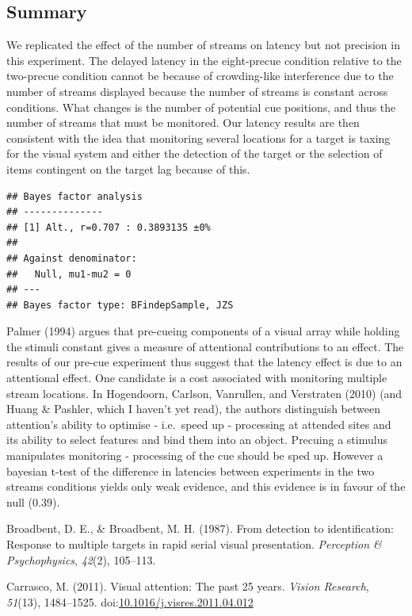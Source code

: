 \documentclass[,man]{apa6}
\theoremstyle{definition}
\theoremstyle{definition}
\theoremstyle{definition}
\theoremstyle{remark}
\begin{document}
\subsection{Summary}\label{summary}

We replicated the effect of the number of streams on latency but not
precision in this experiment. The delayed latency in the eight-precue
condition relative to the two-precue condition cannot be because of
crowding-like interference due to the number of streams displayed
because the number of streams is constant across conditions. What
changes is the number of potential cue positions, and thus the number of
streams that must be monitored. Our latency results are then consistent
with the idea that monitoring several locations for a target is taxing
for the visual system and either the detection of the target or the
selection of items contingent on the target lag because of this.

\begin{verbatim}
## Bayes factor analysis
## --------------
## [1] Alt., r=0.707 : 0.3893135 ±0%
## 
## Against denominator:
##   Null, mu1-mu2 = 0 
## ---
## Bayes factor type: BFindepSample, JZS
\end{verbatim}

Palmer (1994) argues that pre-cueing components of a visual array while
holding the stimuli constant gives a measure of attentional
contributions to an effect. The results of our pre-cue experiment thus
suggest that the latency effect is due to an attentional effect. One
candidate is a cost associated with monitoring multiple stream
locations. In Hogendoorn, Carlson, Vanrullen, and Verstraten (2010) (and
Huang \& Pashler, which I haven't yet read), the authors distinguish
between attention's ability to optimise - i.e.~speed up - processing at
attended sites and its ability to select features and bind them into an
object. Precuing a stimulus manipulates monitoring - processing of the
cue should be sped up. However a bayesian t-test of the difference in
latencies between experiments in the two streams conditions yields only
weak evidence, and this evidence is in favour of the null (0.39).

\hypertarget{refs}{}
\hypertarget{ref-broadbent_detection_1987}{}
Broadbent, D. E., \& Broadbent, M. H. (1987). From detection to
identification: Response to multiple targets in rapid serial visual
presentation. \emph{Perception \& Psychophysics}, \emph{42}(2),
105--113.

\hypertarget{ref-carrasco_visual_2011}{}
Carrasco, M. (2011). Visual attention: The past 25 years. \emph{Vision
Research}, \emph{51}(13), 1484--1525.
doi:\href{https://doi.org/10.1016/j.visres.2011.04.012}{10.1016/j.visres.2011.04.012}
\end{document}
